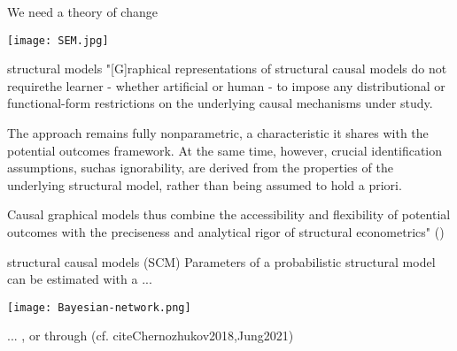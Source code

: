 \documentclass[aspectratio=169]{beamer}
\begin{document}
		\begin{frame}{We need a theory of change}
			\begin{center}
					\texttt{[image: SEM.jpg]}
			\end{center}
		\end{frame}

		\begin{frame}{structural models}
			"[G]raphical representations of structural causal models do not requirethe learner - whether artificial or human - to impose any distributional or functional-form restrictions on the underlying causal mechanisms under study. \\ \vspace*{.1cm}

			The approach remains fully nonparametric, a characteristic it shares with the potential outcomes framework.  At the same time,  however,  crucial identification assumptions,  suchas ignorability, are derived from the properties of the underlying structural model, rather than being assumed to hold a priori.  \\ \vspace*{.1cm}

			Causal graphical models thus combine  the  accessibility  and  flexibility  of  potential  outcomes  with  the  preciseness and  analytical  rigor  of  structural  econometrics" (\cite{Hunermund2021})
		\end{frame}

		\begin{frame}{structural causal models (SCM)}
			Parameters of a probabilistic structural model can be estimated with a \href{https://github.com/stan-dev/rstan/wiki/RStan-Getting-Started}{\underline{}} \href{https://www.bnlearn.com/}{\underline{}} \href{https://github.com/paul-buerkner/brms}{\underline{}} ...
			\begin{center}
				\texttt{[image: Bayesian-network.png]}
			\end{center}
			... \href{https://cran.r-project.org/web/packages/cSEM/vignettes/cSEM.html}{\underline{}}, or through \href{https://github.com/VC2015/DMLonGitHub}{\underline{}} (cf. cite{Chernozhukov2018,Jung2021})
		\end{frame}
\end{document}
